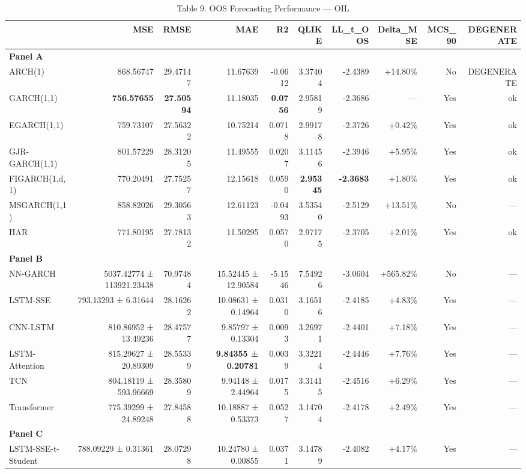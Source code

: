 \begin{table}[ht]
\centering
\caption{Table 9. OOS Forecasting Performance — OIL}
\label{tab:oos_oil}
\begin{tabular}{lrrrrrrrrr}
\toprule
 & MSE & RMSE & MAE & R2 & QLIKE & LL_t_OOS & Delta_MSE & MCS_90 & DEGENERATE \\
\midrule
\multicolumn{10}{l}{\textbf{Panel A}} \\
ARCH(1) & 868.56747 & 29.47147 & 11.67639 & -0.0612 & 3.37404 & -2.4389 & +14.80\% & No & DEGENERATE \\
GARCH(1,1) & \textbf{756.57655} & \textbf{27.50594} & 11.18035 & \textbf{0.0756} & 2.95819 & -2.3686 & — & Yes & ok \\
EGARCH(1,1) & 759.73107 & 27.56322 & 10.75214 & 0.0718 & 2.99178 & -2.3726 & +0.42\% & Yes & ok \\
GJR-GARCH(1,1) & 801.57229 & 28.31205 & 11.49555 & 0.0207 & 3.11456 & -2.3946 & +5.95\% & Yes & ok \\
FIGARCH(1,d,1) & 770.20491 & 27.75257 & 12.15618 & 0.0590 & \textbf{2.95345} & \textbf{-2.3683} & +1.80\% & Yes & ok \\
MSGARCH(1,1) & 858.82026 & 29.30563 & 12.61123 & -0.0493 & 3.53540 & -2.5129 & +13.51\% & No & — \\
HAR & 771.80195 & 27.78132 & 11.50295 & 0.0570 & 2.97175 & -2.3705 & +2.01\% & Yes & ok \\
\multicolumn{10}{l}{\textbf{Panel B}} \\
NN-GARCH & 5037.42774 ± 113921.23438 & 70.97484 & 15.52445 ± 12.90584 & -5.1546 & 7.54926 & -3.0604 & +565.82\% & No & — \\
LSTM-SSE & 793.13293 ± 6.31644 & 28.16262 & 10.08631 ± 0.14964 & 0.0310 & 3.16516 & -2.4185 & +4.83\% & Yes & — \\
CNN-LSTM & 810.86952 ± 13.49236 & 28.47577 & 9.85797 ± 0.13304 & 0.0093 & 3.26971 & -2.4401 & +7.18\% & Yes & — \\
LSTM-Attention & 815.29627 ± 20.89309 & 28.55339 & \textbf{9.84355 ± 0.20781} & 0.0039 & 3.32214 & -2.4446 & +7.76\% & Yes & — \\
TCN & 804.18119 ± 593.96669 & 28.35809 & 9.94148 ± 2.44964 & 0.0175 & 3.31415 & -2.4516 & +6.29\% & Yes & — \\
Transformer & 775.39299 ± 24.89248 & 27.84588 & 10.18887 ± 0.53373 & 0.0527 & 3.14704 & -2.4178 & +2.49\% & Yes & — \\
\multicolumn{10}{l}{\textbf{Panel C}} \\
LSTM-SSE-t-Student & 788.09229 ± 0.31361 & 28.07298 & 10.24780 ± 0.00855 & 0.0371 & 3.14789 & -2.4082 & +4.17\% & Yes & — \\

\end{tabular}
\end{table}
